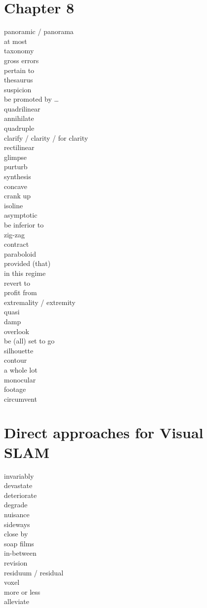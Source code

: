 \documentclass[12pt]{article}
\begin{document}
\section{Chapter 8}
panoramic / panorama  \\
at most  \\
taxonomy  \\
gross errors  \\
pertain to  \\
thesaurus  \\
suspicion  \\
be promoted by \dots  \\
quadrilinear  \\
annihilate  \\
quadruple  \\
clarify / clarity / for clarity \\
rectilinear  \\
glimpse  \\
purturb  \\
synthesis  \\
concave  \\
crank up  \\
isoline  \\
asymptotic  \\
be inferior to  \\
zig-zag  \\
contract  \\
paraboloid  \\
provided (that)  \\
in this regime  \\
revert to  \\
profit from  \\
extremality / extremity  \\
quasi  \\
damp  \\
overlook  \\
be (all) set to go  \\
silhouette  \\
contour  \\
a whole lot  \\
monocular  \\
footage  \\
circumvent  \\

\section{Direct approaches for Visual SLAM}
invariably \\
devastate \\
deteriorate \\
degrade \\
nuisance \\
sideways \\
close by \\
soap films \\
in-between \\
revision \\
residuum / residual \\
voxel \\
more or less \\
alleviate \\
\end{document}
